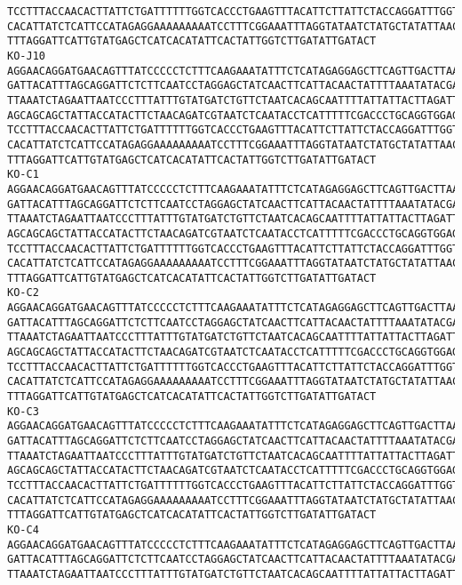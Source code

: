 \documentclass[11pt]{article}
\begin{document}
\begin{Verbatim}[commandchars=\\\{\}]
TCCTTTACCAACACTTATTCTGATTTTTTGGTCACCCTGAAGTTTACATTCTTATTCTACCAGGATTTGGTATTATTTCT
CACATTATCTCATTCCATAGAGGAAAAAAAAATCCTTTCGGAAATTTAGGTATAATCTATGCTATATTAACTATTGGAAT
TTTAGGATTCATTGTATGAGCTCATCACATATTCACTATTGGTCTTGATATTGATACT
KO-J10
AGGAACAGGATGAACAGTTTATCCCCCTCTTTCAAGAAATATTTCTCATAGAGGAGCTTCAGTTGACTTAAGAATCTTCA
GATTACATTTAGCAGGATTCTCTTCAATCCTAGGAGCTATCAACTTCATTACAACTATTTTAAATATACGACCAAAAAAC
TTAAATCTAGAATTAATCCCTTTATTTGTATGATCTGTTCTAATCACAGCAATTTTATTATTACTTAGATTACCAGTCTT
AGCAGCAGCTATTACCATACTTCTAACAGATCGTAATCTCAATACCTCATTTTTCGACCCTGCAGGTGGAGGAGACCCAA
TCCTTTACCAACACTTATTCTGATTTTTTGGTCACCCTGAAGTTTACATTCTTATTCTACCAGGATTTGGTATTATTTCT
CACATTATCTCATTCCATAGAGGAAAAAAAAATCCTTTCGGAAATTTAGGTATAATCTATGCTATATTAACTATTGGAAT
TTTAGGATTCATTGTATGAGCTCATCACATATTCACTATTGGTCTTGATATTGATACT
KO-C1
AGGAACAGGATGAACAGTTTATCCCCCTCTTTCAAGAAATATTTCTCATAGAGGAGCTTCAGTTGACTTAAGAATCTTCA
GATTACATTTAGCAGGATTCTCTTCAATCCTAGGAGCTATCAACTTCATTACAACTATTTTAAATATACGACCAAAAAAC
TTAAATCTAGAATTAATCCCTTTATTTGTATGATCTGTTCTAATCACAGCAATTTTATTATTACTTAGATTACCAGTCTT
AGCAGCAGCTATTACCATACTTCTAACAGATCGTAATCTCAATACCTCATTTTTCGACCCTGCAGGTGGAGGAGACCCAA
TCCTTTACCAACACTTATTCTGATTTTTTGGTCACCCTGAAGTTTACATTCTTATTCTACCAGGATTTGGTATTATTTCT
CACATTATCTCATTCCATAGAGGAAAAAAAAATCCTTTCGGAAATTTAGGTATAATCTATGCTATATTAACTATTGGAAT
TTTAGGATTCATTGTATGAGCTCATCACATATTCACTATTGGTCTTGATATTGATACT
KO-C2
AGGAACAGGATGAACAGTTTATCCCCCTCTTTCAAGAAATATTTCTCATAGAGGAGCTTCAGTTGACTTAAGAATCTTCA
GATTACATTTAGCAGGATTCTCTTCAATCCTAGGAGCTATCAACTTCATTACAACTATTTTAAATATACGACCAAAAAAC
TTAAATCTAGAATTAATCCCTTTATTTGTATGATCTGTTCTAATCACAGCAATTTTATTATTACTTAGATTACCAGTCTT
AGCAGCAGCTATTACCATACTTCTAACAGATCGTAATCTCAATACCTCATTTTTCGACCCTGCAGGTGGAGGAGACCCAA
TCCTTTACCAACACTTATTCTGATTTTTTGGTCACCCTGAAGTTTACATTCTTATTCTACCAGGATTTGGTATTATTTCT
CACATTATCTCATTCCATAGAGGAAAAAAAAATCCTTTCGGAAATTTAGGTATAATCTATGCTATATTAACTATTGGAAT
TTTAGGATTCATTGTATGAGCTCATCACATATTCACTATTGGTCTTGATATTGATACT
KO-C3
AGGAACAGGATGAACAGTTTATCCCCCTCTTTCAAGAAATATTTCTCATAGAGGAGCTTCAGTTGACTTAAGAATCTTCA
GATTACATTTAGCAGGATTCTCTTCAATCCTAGGAGCTATCAACTTCATTACAACTATTTTAAATATACGACCAAAAAAC
TTAAATCTAGAATTAATCCCTTTATTTGTATGATCTGTTCTAATCACAGCAATTTTATTATTACTTAGATTACCAGTCTT
AGCAGCAGCTATTACCATACTTCTAACAGATCGTAATCTCAATACCTCATTTTTCGACCCTGCAGGTGGAGGAGACCCAA
TCCTTTACCAACACTTATTCTGATTTTTTGGTCACCCTGAAGTTTACATTCTTATTCTACCAGGATTTGGTATTATTTCT
CACATTATCTCATTCCATAGAGGAAAAAAAAATCCTTTCGGAAATTTAGGTATAATCTATGCTATATTAACTATTGGAAT
TTTAGGATTCATTGTATGAGCTCATCACATATTCACTATTGGTCTTGATATTGATACT
KO-C4
AGGAACAGGATGAACAGTTTATCCCCCTCTTTCAAGAAATATTTCTCATAGAGGAGCTTCAGTTGACTTAAGAATCTTCA
GATTACATTTAGCAGGATTCTCTTCAATCCTAGGAGCTATCAACTTCATTACAACTATTTTAAATATACGACCAAAAAAC
TTAAATCTAGAATTAATCCCTTTATTTGTATGATCTGTTCTAATCACAGCAATTTTATTATTACTTAGATTACCAGTCTT

\end{Verbatim}
\end{document}

